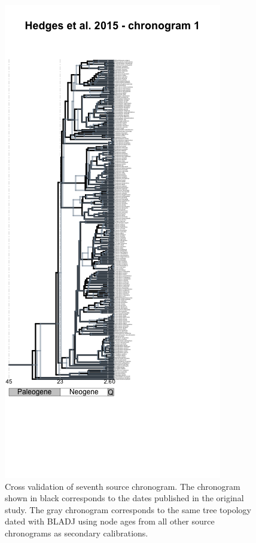 \documentclass[
  english,
  man]{apa6}
\begin{document}
\begin{figure}[!h]
\includegraphics{../figures/figure-cross-validation/cross_validation_7.png}
\caption{Cross validation of seventh source chronogram. The chronogram shown in black corresponds to the dates published in the original study. The gray chronogram corresponds to the same tree topology dated with BLADJ using node ages from all other source chronograms as secondary calibrations.}
\label{fig:cv7}
\end{figure}
\end{document}
